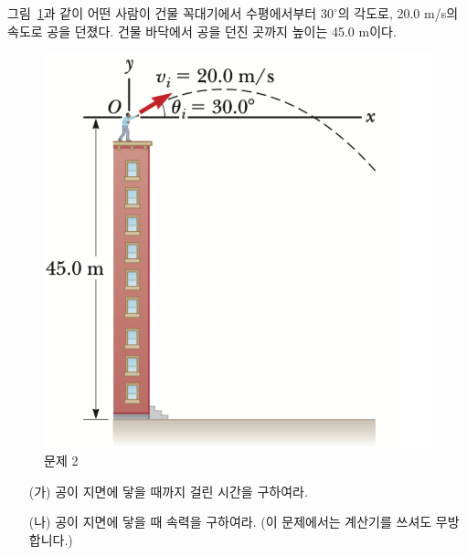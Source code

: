 \documentclass[floatfix,nofootinbib,superscriptaddress,fleqn,preprint]{revtex4}
\begin{document}
그림~\ref{fig:1}과 같이 어떤 사람이 건물
꼭대기에서 수평에서부터 $30^\circ$의 각도로, 20.0 m/s의 속도로
공을 던졌다. 건물 
바닥에서 공을 던진 곳까지 높이는 45.0 m이다. 
\begin{figure}[ht]
  \centering
\includegraphics[scale=0.6]{Qfig4-2.pdf}  
  \caption{문제 2}
  \label{fig:1}
\end{figure}
\begin{itemize}
\item[(가)] 공이 지면에 닿을 때까지 걸린 시간을 구하여라.
\item[(나)] 공이 지면에 닿을 때 속력을 구하여라. (이 문제에서는 계산기를
  쓰셔도 무방합니다.)
\end{itemize}
\end{document}

